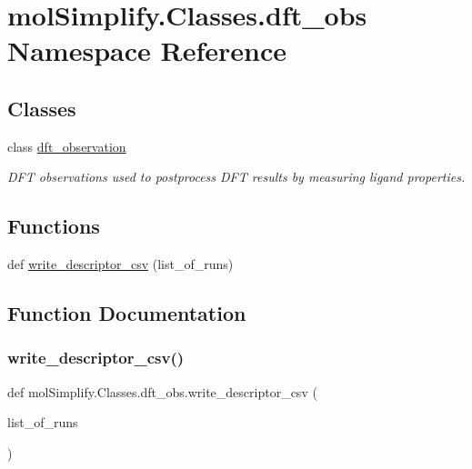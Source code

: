 \hypertarget{namespacemolSimplify_1_1Classes_1_1dft__obs}{}\section{mol\+Simplify.\+Classes.\+dft\+\_\+obs Namespace Reference}
\label{namespacemolSimplify_1_1Classes_1_1dft__obs}
\subsection*{Classes}
\begin{DoxyCompactItemize}
\item 
class \hyperlink{classmolSimplify_1_1Classes_1_1dft__obs_1_1dft__observation}{dft\+\_\+observation}
\begin{DoxyCompactList}\small\item\em D\+FT observations used to postprocess D\+FT results by measuring ligand properties. \end{DoxyCompactList}\end{DoxyCompactItemize}
\subsection*{Functions}
\begin{DoxyCompactItemize}
\item 
def \hyperlink{namespacemolSimplify_1_1Classes_1_1dft__obs_aa94ab87c9282139d0153929f9a0ff9c9}{write\+\_\+descriptor\+\_\+csv} (list\+\_\+of\+\_\+runs)
\end{DoxyCompactItemize}


\subsection{Function Documentation}
\mbox{\label{namespacemolSimplify_1_1Classes_1_1dft__obs_aa94ab87c9282139d0153929f9a0ff9c9}} 
\subsubsection{\texorpdfstring{write\+\_\+descriptor\+\_\+csv()}{write\_descriptor\_csv()}}
{\footnotesize\ttfamily def mol\+Simplify.\+Classes.\+dft\+\_\+obs.\+write\+\_\+descriptor\+\_\+csv (\begin{DoxyParamCaption}\item[{}]{list\+\_\+of\+\_\+runs }\end{DoxyParamCaption})}

